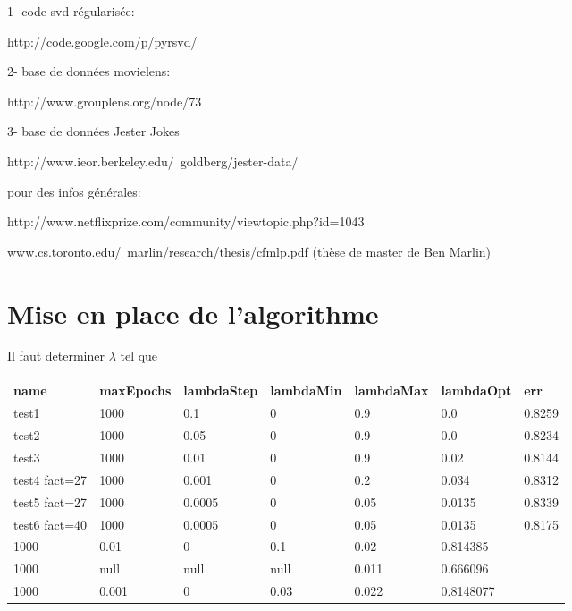 \documentclass[a4paper]{article}
\newenvironment{Figure}
  {\par\medskip\noindent\minipage{\linewidth}}
  {\endminipage\par\medskip}
\begin{document}
1- code svd régularisée:

http://code.google.com/p/pyrsvd/

2- base de données movielens:

http://www.grouplens.org/node/73

3- base de données Jester Jokes

http://www.ieor.berkeley.edu/~goldberg/jester-data/

pour des infos générales:

http://www.netflixprize.com/community/viewtopic.php?id=1043

www.cs.toronto.edu/~marlin/research/thesis/cfmlp.pdf
(thèse de master de Ben Marlin)







\section{Mise en place de l'algorithme}

Il faut determiner $\lambda$ tel que 

\begin{Figure}
 \centering
\begin{tabular}{l|llllll}
   \hline
  name & maxEpochs & lambdaStep & lambdaMin & lambdaMax & lambdaOpt & err \\
   \hline
test1 & 1000 & 0.1 & 0 & 0.9 & 0.0 & 0.8259\\

test2 & 1000 & 0.05 & 0 & 0.9 & 0.0 & 0.8234\\

test3 & 1000 & 0.01 & 0 & 0.9 & 0.02 & 0.8144\\

test4 fact=27 & 1000 & 0.001 & 0 & 0.2 & 0.034 & 0.8312\\

test5 fact=27 & 1000 & 0.0005 & 0 & 0.05 & 0.0135 & 0.8339\\

test6 fact=40 & 1000 & 0.0005 & 0 & 0.05 & 0.0135 & 0.8175 \\


\hline
1000 & 0.01 & 0 & 0.1 &  0.02 & 0.814385 \\
\hline

1000 & null & null & null & 0.011 & 0.666096\\
\hline


1000 & 0.001 & 0 & 0.03 & 0.022 & 0.8148077\\
\hline
\end{tabular}
\end{Figure}
\end{document}
